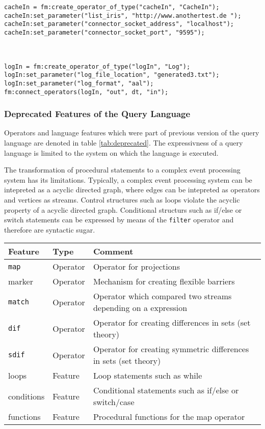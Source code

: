 \begin{lstlisting}[language=Flow, caption={\emph{Generated LUA code of system operators}},label={lst:exanlua}]
cacheIn = fm:create_operator_of_type("cacheIn", "CacheIn");
cacheIn:set_parameter("list_iris", "http://www.anothertest.de ");
cacheIn:set_parameter("connector_socket_address", "localhost");
cacheIn:set_parameter("connector_socket_port", "9595");



logIn = fm:create_operator_of_type("logIn", "Log");
logIn:set_parameter("log_file_location", "generated3.txt");
logIn:set_parameter("log_format", "aal");
fm:connect_operators(logIn, "out", dt, "in");
\end{lstlisting}

\subsubsection{Deprecated Features of the Query Language}
Operators and language features which were part of previous version of the query
language are denoted in table \ref{tab:deprecated}. The expressivness of a query
language is limited to the system on which the language is executed.

The transformation of procedural statements to a complex event processing system
has its limitations. Typically, a complex event processing system can be 
intepreted as a acyclic directed graph, where edges can be intepreted as 
operators and vertices as streams. Control structures such as loops violate the
acyclic property of a acyclic directed graph. Conditional structurs such as 
if/else or switch statements can be expressed by means of the \texttt{filter}
operator and therefore are syntactic sugar. 
\begin{center}
  \begin{tabular}{|l|l|l|}
  \hline
  \textbf{Feature} & \textbf{Type} & \textbf{Comment} \\
  \hline
  \hline
  \texttt{map} & Operator & Operator for projections \\
  \hline
  marker & Operator & Mechanism for creating flexible barriers \\
  \hline
  \texttt{match} & Operator & Operator which compared two streams depending on a expression \\
  \hline
  \texttt{dif} & Operator & Operator for creating differences in sets (set theory) \\
  \hline
  \texttt{sdif} & Operator & Operator for creating symmetric differences in sets (set theory) \\
  \hline
  loops & Feature & Loop statements such as while  \\
  \hline
  conditions & Feature & Conditional statements such as if/else or switch/case \\
  \hline
  functions & Feature & Procedural functions for the map operator \\
  \hline
  \end{tabular}
  \label{tab:deprecated}
\end{center}

